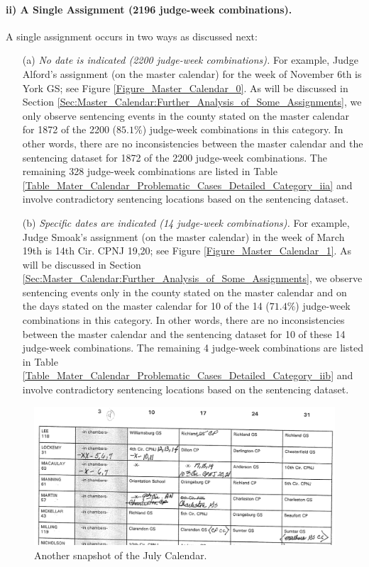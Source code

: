 \documentclass[11pt, oneside]{article}   	%
\theoremstyle{ModifiedStyle}
\begin{document}
\paragraph{ii) A Single Assignment (2196 judge-week combinations).} 
\label{Category_ii}
A single assignment occurs in two ways as discussed next:
	\begin{itemize}
		\vspace{-2mm}
		\item[(a)] \emph{No date is indicated (2200 judge-week combinations).} For example, Judge Alford's assignment (on the master calendar) for the week of November 6th is York GS; see Figure \ref{Figure_Master_Calendar_0}. As will be discussed in Section \ref{Sec:Master_Calendar:Further_Analysis_of_Some_Assignments}, we only observe sentencing events in the county stated on the master calendar for 1872 of the 2200 ($85.1\%$) judge-week combinations in this category. In other words, there are no inconsistencies between the master calendar and the sentencing dataset for 1872 of the 2200 judge-week combinations. The remaining 328 judge-week combinations are listed in Table \ref{Table_Mater_Calendar_Problematic_Cases_Detailed_Category_iia} and involve contradictory sentencing locations based on the sentencing dataset.
		\vspace{-2mm}
		\item[(b)] \emph{Specific dates are indicated (14 judge-week combinations).} For example, Judge Smoak's assignment (on the master calendar) in the week of March 19th is 14th Cir. CPNJ 19,20; see Figure \ref{Figure_Master_Calendar_1}. As will be discussed in Section \ref{Sec:Master_Calendar:Further_Analysis_of_Some_Assignments}, we observe sentencing events only in the county stated on the master calendar and on the days stated on the master calendar for 10 of the 14 ($71.4\%$) judge-week combinations in this category. In other words, there are no inconsistencies between the master calendar and the sentencing dataset for 10 of these 14 judge-week combinations. The remaining 4 judge-week combinations are listed in Table \ref{Table_Mater_Calendar_Problematic_Cases_Detailed_Category_iib} and involve contradictory sentencing locations based on the sentencing dataset.
	\end{itemize}

\begin{figure}[ht]
	\centering
	\includegraphics[scale=0.6]{Figures/Fig4}
	\caption{Another snapshot of the July Calendar.}
	\label{Figure_Master_Calendar_4}
\end{figure} 
\end{document}
